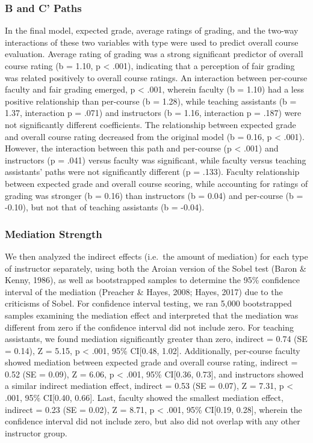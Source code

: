 \documentclass[man]{apa6}
\theoremstyle{definition}
\theoremstyle{definition}
\theoremstyle{definition}
\theoremstyle{remark}
\begin{document}
\subsubsection{B and C' Paths}\label{b-and-c-paths}

In the final model, expected grade, average ratings of grading, and the
two-way interactions of these two variables with type were used to
predict overall course evaluation. Average rating of grading was a
strong significant predictor of overall course rating (b = 1.10, p
\textless{} .001), indicating that a perception of fair grading was
related positively to overall course ratings. An interaction between
per-course faculty and fair grading emerged, p \textless{} .001, wherein
faculty (b = 1.10) had a less positive relationship than per-course (b =
1.28), while teaching assistants (b = 1.37, interaction p = .071) and
instructors (b = 1.16, interaction p = .187) were not significantly
different coefficients. The relationship between expected grade and
overall course rating decreased from the original model (b = 0.16, p
\textless{} .001). However, the interaction between this path and
per-course (p \textless{} .001) and instructors (p = .041) versus
faculty was significant, while faculty versus teaching assistants' paths
were not significantly different (p = .133). Faculty relationship
between expected grade and overall course scoring, while accounting for
ratings of grading was stronger (b = 0.16) than instructors (b = 0.04)
and per-course (b = -0.10), but not that of teaching assistants (b =
-0.04).

\subsubsection{Mediation Strength}\label{mediation-strength}

We then analyzed the indirect effects (i.e.~the amount of mediation) for
each type of instructor separately, using both the Aroian version of the
Sobel test (Baron \& Kenny, 1986), as well as bootstrapped samples to
determine the 95\% confidence interval of the mediation (Preacher \&
Hayes, 2008; Hayes, 2017) due to the criticisms of Sobel. For confidence
interval testing, we ran 5,000 bootstrapped samples examining the
mediation effect and interpreted that the mediation was different from
zero if the confidence interval did not include zero. For teaching
assistants, we found mediation significantly greater than zero, indirect
= 0.74 (SE = 0.14), Z = 5.15, p \textless{} .001, 95\% CI{[}0.48,
1.02{]}. Additionally, per-course faculty showed mediation between
expected grade and overall course rating, indirect = 0.52 (SE = 0.09), Z
= 6.06, p \textless{} .001, 95\% CI{[}0.36, 0.73{]}, and instructors
showed a similar indirect mediation effect, indirect = 0.53 (SE = 0.07),
Z = 7.31, p \textless{} .001, 95\% CI{[}0.40, 0.66{]}. Last, faculty
showed the smallest mediation effect, indirect = 0.23 (SE = 0.02), Z =
8.71, p \textless{} .001, 95\% CI{[}0.19, 0.28{]}, wherein the
confidence interval did not include zero, but also did not overlap with
any other instructor group.
\end{document}
